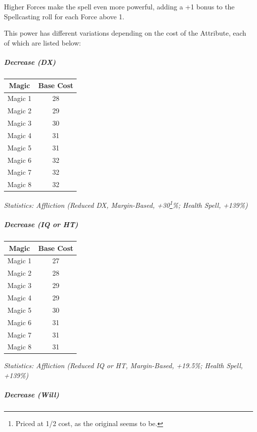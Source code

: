 \begin{multicols}{3}
	Higher Forces make the spell even more powerful, adding a +1 bonus to the Spellcasting roll for each Force above 1.
	
	This power has different variations depending on the cost of the Attribute, each of which are listed below:
	
	\subparagraph{Decrease (DX)}
	
	\begin{center}
		\begin{tabular}{|c|c|}
			\hline
			Magic & Base Cost \\
			\hline
			\hline
			Magic 1 & 28 \\
			Magic 2 & 29 \\
			Magic 3 & 30 \\
			Magic 4 & 31 \\
			Magic 5 & 31 \\
			Magic 6 & 32 \\
			Magic 7 & 32 \\
			Magic 8 & 32 \\
			\hline
		\end{tabular}
	\end{center}	
	
	\textcolor{OliveGreen}{\textit{Statistics: Affliction (Reduced DX, Margin-Based, +30\footnote{Priced at 1/2 cost, as the original seems to be.}\%; Health Spell, +139\%) }}
	
	\subparagraph{Decrease (IQ or HT)}
	
	\begin{center}
		\begin{tabular}{|c|c|}
			\hline
			Magic & Base Cost \\
			\hline
			\hline
			Magic 1 & 27 \\
			Magic 2 & 28 \\
			Magic 3 & 29  \\
			Magic 4 & 29 \\
			Magic 5 & 30 \\
			Magic 6 & 31 \\
			Magic 7 & 31 \\
			Magic 8 & 31 \\
			\hline
		\end{tabular}
	\end{center}	
	
	\textcolor{OliveGreen}{\textit{Statistics: Affliction (Reduced IQ or HT, Margin-Based, +19.5\%; Health Spell, +139\%) }}
	
	\subparagraph{Decrease (Will)}
	

\end{multicols}
